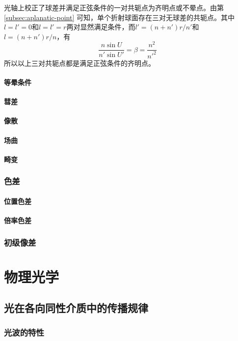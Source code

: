 \documentclass[cn,10pt,chinesefont=founder,math=mtpro2,cite=super,toc=onecol,twoside,openany]{elegantbook}
\begin{document}
光轴上校正了球差并满足正弦条件的一对共轭点为齐明点或不晕点。由第 \ref{subsec:aplanatic-point} 可知，单个折射球面存在三对无球差的共轭点。其中$l=l'=0$和$l=l'=r$两对显然满足条件，而$l'=(n+n')r/n'$和$l=(n+n')r/n$，有
\begin{equation}
\frac{n\sin U}{n'\sin U'}=\beta=\frac{n^2}{n'^2}
\end{equation}
所以以上三对共轭点都是满足正弦条件的齐明点。

\subsection{等晕条件}


\subsection{彗差}
\subsection{像散}
\subsection{场曲}
\subsection{畸变}
\section{色差}
\subsection{位置色差}
\subsection{倍率色差}
\section{初级像差}
\part{物理光学}

\chapter{光在各向同性介质中的传播规律}
\section{光波的特性}
\end{document}

